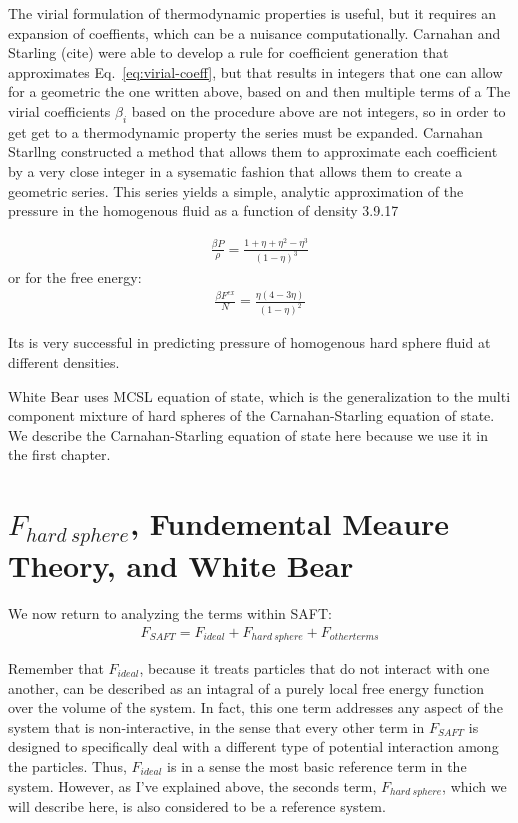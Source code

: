 The virial formulation of thermodynamic properties is useful, but it
requires an expansion of coeffients, which can be a nuisance
computationally.  Carnahan and Starling (cite) were able to develop a
rule for coefficient generation that approximates
Eq.~\ref{eq:virial-coeff}, but that results in integers that one can
allow for a geometric the one written above, based on and then
multiple terms of a The virial coefficients $\beta_i$ based on the
procedure above are not integers, so in order to get get to a
thermodynamic property the series must be expanded.  Carnahan Starllng
constructed a method that allows them to approximate each coefficient
by a very close integer in a sysematic fashion that allows them to
create a geometric series.  This series yields a simple, analytic
approximation of the pressure in the homogenous fluid as a function of
density 3.9.17


\begin{align}
  \frac{\beta P}{\rho}=\frac{1+\eta+\eta^2-\eta^3}{(1-\eta)^3}
\end{align}
or for the free energy:
\begin{align}
  \frac{\beta F^{ex}}{N}=\frac{\eta(4-3\eta)}{(1-\eta)^2}
\end{align}

Its is very successful in predicting pressure of homogenous hard
sphere fluid at different densities.

White Bear uses MCSL equation of state, which is the generalization to
the multi component mixture of hard spheres of the Carnahan-Starling
equation of state.  We describe the Carnahan-Starling equation of
state here because we use it in the first chapter.





\section{$F_{hard~sphere}$, Fundemental Meaure Theory, and White Bear}

We now return to analyzing the terms within SAFT:
\begin{align}
  F_{SAFT} = F_{ideal} + F_{hard~sphere} + F_{other terms}
\end{align}

Remember that $F_{ideal}$, because it treats particles that do not
interact with one another, can be described as an intagral of a purely
local free energy function over the volume of the system.  In fact,
this one term addresses any aspect of the system that is
non-interactive, in the sense that every other term in $F_{SAFT}$ is
designed to specifically deal with a different type of potential
interaction among the particles.  Thus, $F_{ideal}$ is in a sense the
most basic reference term in the system.  However, as I've explained
above, the seconds term, $F_{hard~sphere}$, which we will describe here,
is also considered to be a reference system.

